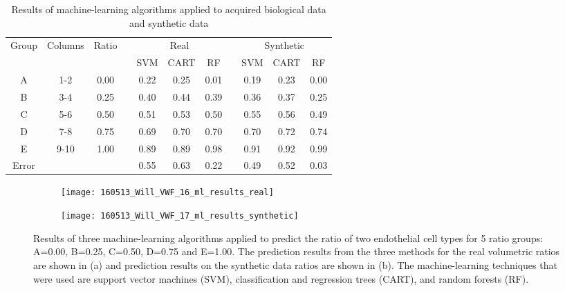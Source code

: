 \begin{table}[htbp!]
\centering
\caption[Mixed ratios cell classification machine learning performance]{Results of machine-learning algorithms applied to acquired biological data and synthetic data}
\label{table:endothelial_morphometry:cell_classification_performance}
\begin{tabular}{c c c c c c c c c c c}
\toprule
\multirow{2}{*}{Group} & \multirow{2}{*}{Columns} & \multirow{2}{*}{Ratio} & & \multicolumn{3}{c}{Real} & & \multicolumn{3}{c}{Synthetic}\\
\cmidrule{5-7}
\cmidrule{9-11}
	& & & & SVM & CART & RF & & SVM & CART & RF\\
\midrule
	A & 1-2 & 0.00 & & 0.22 & 0.25 & 0.01 & & 0.19 & 0.23 & 0.00 \\
	B & 3-4 & 0.25 & & 0.40 & 0.44 & 0.39 & & 0.36 & 0.37 & 0.25 \\
	C & 5-6 & 0.50 & & 0.51 & 0.53 & 0.50 & & 0.55 & 0.56 & 0.49 \\
	D & 7-8 & 0.75 & & 0.69 & 0.70 & 0.70 & & 0.70 & 0.72 & 0.74 \\
	E & 9-10 &1.00 & & 0.89 & 0.89 & 0.98 & & 0.91 & 0.92 & 0.99 \\
\midrule
	Error & & & & 0.55 & 0.63 & 0.22 & & 0.49 & 0.52 & 0.03 \\
\bottomrule
\end{tabular}
\end{table}

\begin{figure}[htbp!]
	\centering
	\begin{subfigure}[b]{\linewidth}
		\centering
		\texttt{[image: 160513\_Will\_VWF\_16\_ml\_results\_real]}
		\caption{}
		\label{figure:endothelial_morphometry:cell_classification_performance:real}
		\vspace{1ex}
	\end{subfigure}
	\begin{subfigure}[b]{\linewidth}
		\centering
		\texttt{[image: 160513\_Will\_VWF\_17\_ml\_results\_synthetic]}
		\caption{}
		\label{figure:endothelial_morphometry:cell_classification_performance:synthetic}
		\vspace{1ex}
	\end{subfigure}
\caption[Machine learning results in cell classification study]{Results of three machine-learning algorithms applied to predict the ratio of two endothelial cell types for 5 ratio groups: A=0.00, B=0.25, C=0.50, D=0.75 and E=1.00. The prediction results from the three methods for the real volumetric ratios are shown in (a) and prediction results on the synthetic data ratios are shown in (b). The machine-learning techniques that were used are support vector machines (SVM), classification and regression trees (CART), and random forests (RF).}
\label{figure:endothelial_morphometry:cell_classification_performance}
\end{figure}

